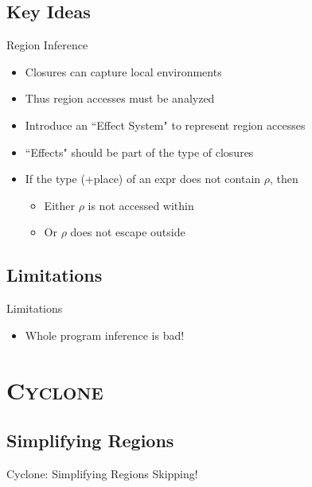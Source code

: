 \documentclass[xcolor=x11names,compress]{beamer}
\renewcommand{\(}{\begin{columns}}
\renewcommand{\)}{\end{columns}}
\newcommand{\<}[1]{\begin{column}{#1}}
\renewcommand{\>}{\end{column}}
\begin{document}
\subsection{Key Ideas}
\begin{frame}{Region Inference}
    \begin{itemize}
        \item Closures can capture local environments
        \pause
        \item Thus region accesses must be analyzed
        \pause
        \item Introduce an ``Effect System" to represent region accesses
        \pause
        \item ``Effects" should be part of the type of closures
        \pause
        \item If the type (+place) of an expr does not contain $\rho$, then
        \pause
        \begin{itemize}
            \item Either $\rho$ is not accessed within
            \pause
            \item Or $\rho$ does not escape outside
        \end{itemize}
    \end{itemize}
\end{frame}

\subsection{Limitations}
\begin{frame}{Limitations}
    \begin{itemize}
        \item Whole program inference is bad!
    \end{itemize}
\end{frame}

\section{\scshape Cyclone}
\subsection{Simplifying Regions}
\begin{frame}{Cyclone: Simplifying Regions}
    Skipping!
\end{frame}
\end{document}
